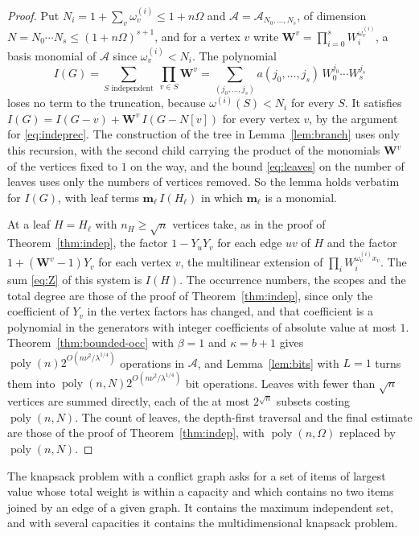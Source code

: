 \documentclass[11pt,reqno]{amsart}
\numberwithin{equation}{section}
\theoremstyle{plain}
\theoremstyle{definition}
\theoremstyle{remark}
\DeclareMathOperator{\poly}{poly}
\newcommand{\A}{\mathcal{A}}
\begin{document}
\begin{proof}
Put $N_i=1+\sum_v\omega^{(i)}_v\le1+n\Omega$ and $\A=\A_{N_0,\dots,N_s}$, of
dimension $N=N_0\cdots N_s\le(1+n\Omega)^{s+1}$, and for a vertex $v$ write
$\mathbf W^{v}=\prod_{i=0}^{s}W_i^{\omega^{(i)}_v}$, a basis monomial of $\A$ since
$\omega^{(i)}_v<N_i$. The
polynomial
\[
  I(G)=\sum_{S\text{ independent}}\ \prod_{v\in S}\mathbf W^{v}
  =\sum_{(j_0,\dots,j_s)}a(j_0,\dots,j_s)\,W_0^{j_0}\cdots W_s^{j_s}
\]
loses no term to the truncation, because $\omega^{(i)}(S)<N_i$ for every $S$.
It satisfies $I(G)=I(G-v)+\mathbf W^{v}\,I(G-N[v])$ for every vertex $v$, by the
argument for \eqref{eq:indeprec}. The construction of the tree in
Lemma~\ref{lem:branch} uses only this recursion, with the second child carrying
the product of the monomials $\mathbf W^{v}$ of the vertices fixed to $1$ on the
way, and the bound \eqref{eq:leaves} on the number of leaves uses only the
numbers of vertices removed. So the lemma holds verbatim for $I(G)$, with leaf
terms $\mathbf m_\ell\,I(H_\ell)$ in which $\mathbf m_\ell$ is a monomial.

At a leaf $H=H_\ell$ with $n_H\ge\sqrt n$ vertices take, as in the proof of
Theorem~\ref{thm:indep}, the factor $1-Y_uY_v$ for each edge $uv$ of $H$ and
the factor $1+(\mathbf W^{v}-1)Y_v$ for each vertex $v$, the multilinear
extension of $\prod_i W_i^{\omega^{(i)}_vx_v}$. The sum \eqref{eq:Z} of this
system is $I(H)$. The occurrence numbers, the scopes and the total degree are
those of the proof of Theorem~\ref{thm:indep}, since only the coefficient of
$Y_v$ in the vertex factors has changed, and that coefficient is a polynomial
in the generators with integer coefficients of absolute value at most $1$.
Theorem~\ref{thm:bounded-occ} with $\beta=1$ and $\kappa=b+1$ gives
$\poly(n)2^{O(n\nu^2/\lambda^{1/4})}$ operations in $\A$, and
Lemma~\ref{lem:bits} with $L=1$ turns them into
$\poly(n,N)2^{O(n\nu^2/\lambda^{1/4})}$ bit operations. Leaves with fewer than
$\sqrt n$ vertices are summed directly, each of the at most $2^{\sqrt n}$
subsets costing $\poly(n,N)$. The count of leaves, the depth-first traversal
and the final estimate are those of the proof of Theorem~\ref{thm:indep}, with
$\poly(n,\Omega)$ replaced by $\poly(n,N)$.
\end{proof}

The knapsack problem with a conflict graph \cite{PS09} asks for a set of items
of largest value whose total weight is within a capacity and which contains no
two items joined by an edge of a given graph. It contains the maximum
independent set, and with several capacities it contains the multidimensional
knapsack problem.
\end{document}
